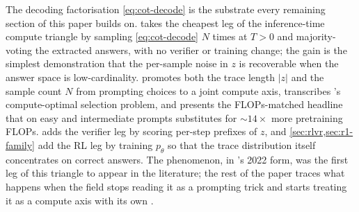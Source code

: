 The decoding factorisation \cref{eq:cot-decode} is the substrate every
remaining section of this paper builds on. 
takes the cheapest leg of the inference-time compute triangle by
sampling \cref{eq:cot-decode} $N$ times at $T > 0$ and majority-voting
the extracted answers, with no verifier or training change; the gain
is the simplest demonstration that the per-sample noise in $z$ is
recoverable when the answer space is low-cardinality.
 promotes both the trace length $|z|$ and
the sample count $N$ from prompting choices to a joint compute axis,
transcribes \citet{snell2024}'s compute-optimal selection problem, and
presents the FLOPs-matched headline that on easy and intermediate
prompts  substitutes for ${\sim}14\times$ more
pretraining FLOPs.  adds the verifier
leg by scoring per-step prefixes of $z$, and \cref{sec:rlvr,sec:r1-family}
add the RL leg by training $p_\theta$ so that the trace distribution
itself concentrates on correct answers. The  phenomenon, in
\citet{wei2022-cot}'s 2022 form, was the first leg of this triangle to
appear in the literature; the rest of the paper traces what happens
when the field stops reading it as a prompting trick and starts
treating it as a compute axis with its own .
